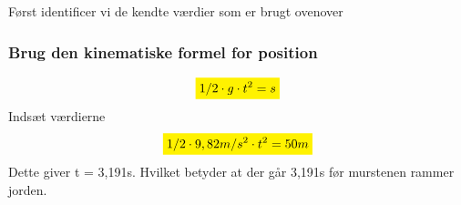 Først identificer vi de kendte værdier som er brugt ovenover

\subsubsection{Brug den kinematiske formel for position}
\begin{equation*}
    \mathcolorbox{yellow}{1/2\cdot g\cdot t^{2}=s}
\end{equation*}
Indsæt værdierne
\begin{equation*}
    \mathcolorbox{yellow}{1/2\cdot9,82m/s^{2}\cdot t^{2}=50m}
\end{equation*}
Dette giver t = 3,191s. Hvilket betyder at der går 3,191s før murstenen rammer jorden.


\newpage
